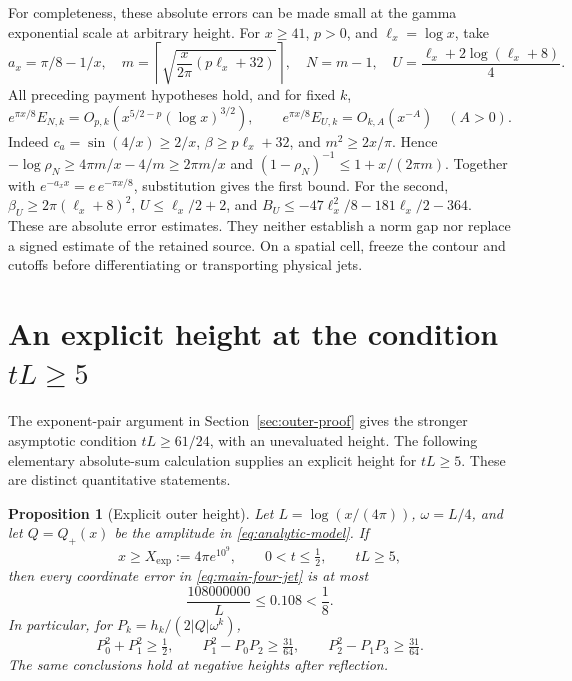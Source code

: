 \documentclass[11pt]{article}
\numberwithin{equation}{section}
\newtheorem{proposition}[theorem]{Proposition}
\theoremstyle{definition}
\theoremstyle{remark}
\begin{document}
For completeness, these absolute errors can be made small at the gamma
exponential scale at arbitrary height. For $x\ge41$, $p>0$, and
$\ell_x=\log x$, take
\[
 a_x=\pi/8-1/x,\quad
 m=\left\lceil\sqrt{\frac{x}{2\pi}(p\ell_x+32)}\right\rceil,
 \quad N=m-1,\quad U=\frac{\ell_x+2\log(\ell_x+8)}4.
\]
All preceding payment hypotheses hold, and for fixed $k$,
\begin{equation}
 e^{\pi x/8}E_{N,k}=O_{p,k}(x^{5/2-p}(\log x)^{3/2}),\qquad
 e^{\pi x/8}E_{U,k}=O_{k,A}(x^{-A})\quad(A>0).
 \label{eq:adaptive-payments}
\end{equation}
Indeed $c_a=\sin(4/x)\ge2/x$, $\beta\ge p\ell_x+32$, and
$m^2\ge2x/\pi$. Hence
$-\log\rho_N\ge4\pi m/x-4/m\ge2\pi m/x$ and
$(1-\rho_N)^{-1}\le1+x/(2\pi m)$.
Together with $e^{-a_xx}=e\,e^{-\pi x/8}$, substitution gives the
first bound. For the second,
$\beta_U\ge2\pi(\ell_x+8)^2$, $U\le\ell_x/2+2$, and
$B_U\le-47\ell_x^2/8-181\ell_x/2-364$.
These are absolute error estimates. They neither establish a norm gap
nor replace a signed estimate of the retained source. On a spatial cell,
freeze the contour and cutoffs before differentiating or transporting
physical jets.


\section{An explicit height at the condition \texorpdfstring{$tL\ge5$}{tL >= 5}}
\label{app:explicit-height}

The exponent-pair argument in Section~\ref{sec:outer-proof} gives the
stronger asymptotic condition $tL\ge61/24$, with an unevaluated
height. The following elementary absolute-sum calculation supplies an
explicit height for $tL\ge5$. These are distinct quantitative statements.

\begin{proposition}[Explicit outer height]\label{prop:explicit-height}
Let $L=\log(x/(4\pi))$, $\omega=L/4$, and let $Q=Q_+(x)$ be the
amplitude in \eqref{eq:analytic-model}. If
\[
 x\ge X_{\mathrm{exp}}:=4\pi e^{10^9},\qquad
 0<t\le\tfrac12,\qquad tL\ge5,
\]
then every coordinate error in \eqref{eq:main-four-jet} is at most
\begin{equation}
 \frac{108000000}{L}\le0.108<\frac18.
 \label{eq:effective-four-jet-budget}
\end{equation}
In particular, for $P_k=h_k/(2|Q|\omega^k)$,
\[
 P_0^2+P_1^2\ge\tfrac12,\qquad
 P_1^2-P_0P_2\ge\tfrac{31}{64},\qquad
 P_2^2-P_1P_3\ge\tfrac{31}{64}.
\]
The same conclusions hold at negative heights after reflection.
\end{proposition}
\end{document}
